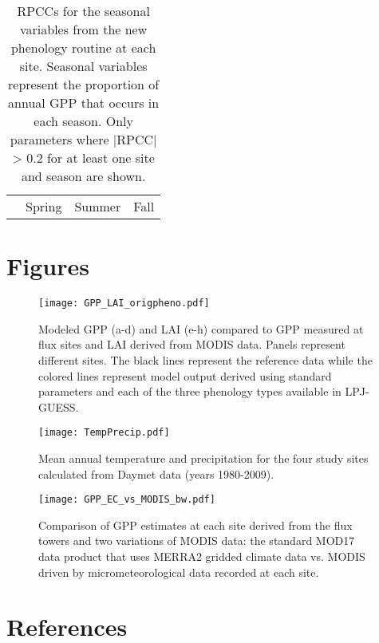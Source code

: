 \documentclass[]{article}
\begin{document}
\begin{table}[ht]
	\begin{threeparttable}
		\caption{RPCCs for the seasonal variables from the new phenology routine at each site. Seasonal variables represent the proportion of annual GPP that occurs in each season. Only parameters where |RPCC| > 0.2 for at least one site and season are shown.} 
		\begin{tabularx}{\textwidth}{lrrrrrrrrrrrr}
			\toprule
			& \multicolumn{4}{c}{Spring} & \multicolumn{4}{c}{Summer} & \multicolumn{4}{c}{Fall} \\
			\cmidrule(lr){2-5} \cmidrule(lr){6-9} \cmidrule(lr){10-13}
			
		\end{tabularx}
	\end{threeparttable}
\end{table}

\section{Figures}
\begin{figure}[!htbp]
\begin{measuredfigure}
	\texttt{[image: GPP\_LAI\_origpheno.pdf]}
	\caption{Modeled GPP (a-d) and LAI (e-h) compared to GPP measured at flux sites and LAI derived from MODIS data. Panels represent different sites. The black lines represent the reference data while the colored lines represent model output derived using standard parameters and each of the three phenology types available in LPJ-GUESS.}
	\label{fig:origpheno}
	\end{measuredfigure}
\end{figure}

\begin{figure}[!htbp]
	\begin{measuredfigure}
		\texttt{[image: TempPrecip.pdf]}
		\caption{Mean annual temperature and precipitation for the four study sites calculated from Daymet data (years 1980-2009).}
		\label{fig:origpheno}
	\end{measuredfigure}
\end{figure}

\begin{figure}[!htbp]
	\begin{measuredfigure}
		\texttt{[image: GPP\_EC\_vs\_MODIS\_bw.pdf]}
		\caption{Comparison of GPP estimates at each site derived from the flux towers and two variations of MODIS data: the standard MOD17 data product that uses MERRA2 gridded climate data vs. MODIS driven by micrometeorological data recorded at each site.}
		\label{fig:origpheno}
	\end{measuredfigure}
\end{figure}

\section{References}


\end{document}
